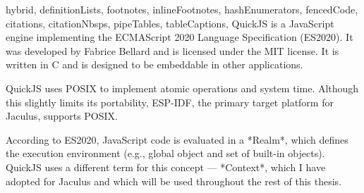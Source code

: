 \begin{markdown*}{%
  hybrid,
  definitionLists,
  footnotes,
  inlineFootnotes,
  hashEnumerators,
  fencedCode,
  citations,
  citationNbsps,
  pipeTables,
  tableCaptions,
}
QuickJS\cite{quickjs} is a JavaScript engine implementing the ECMAScript 2020 Language Specification\cite{es2020} (ES2020). It was developed by Fabrice Bellard and is licensed under the MIT license. It is written in C and is designed to be embeddable in other applications.

QuickJS uses POSIX to implement atomic operations and system time. Although this slightly limits its portability, ESP-IDF, the primary target platform for Jaculus, supports POSIX.

According to ES2020, JavaScript code is evaluated in a *Realm*, which defines the execution environment (e.g., global object and set of built-in objects). QuickJS uses a different term for this concept --- *Context*, which I have adopted for Jaculus and which will be used throughout the rest of this thesis.


\end{markdown*}
